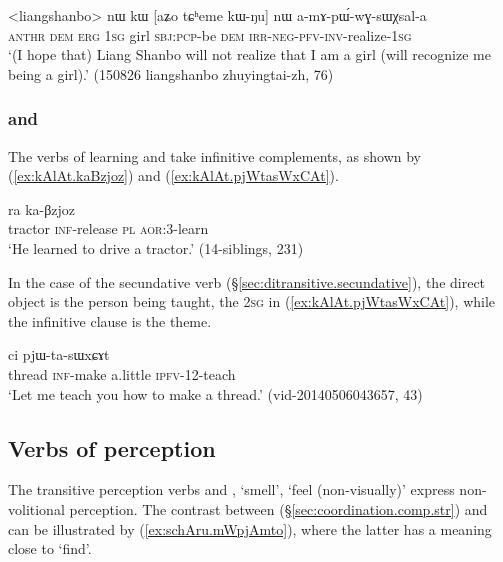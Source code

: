 \begin{exe}
\ex \label{ex:kWNu.amApWwGsWXsala}
 \gll <liangshanbo> nɯ kɯ [aʑo tɕʰeme kɯ-ŋu] nɯ a-mɤ-pɯ́-wɣ-sɯχsal-a \\
  \textsc{anthr} \textsc{dem} \textsc{erg} \textsc{1sg} girl \textsc{sbj}:\textsc{pcp}-be \textsc{dem} \textsc{irr}-\textsc{neg}-\textsc{pfv}-\textsc{inv}-realize-\textsc{1sg} \\
 \glt `(I hope that) Liang Shanbo will not realize that I am a girl (will recognize me being a girl).' (150826 liangshanbo zhuyingtai-zh, 76)
 \end{exe}

 
 \subsubsection{ and } \label{sec:Bzjoz.sWxCAt.complement}
 The verbs of learning  and  take infinitive complements, as shown by (\ref{ex:kAlAt.kaBzjoz}) and (\ref{ex:kAlAt.pjWtasWxCAt}).
 
\begin{exe}
\ex \label{ex:kAlAt.kaBzjoz}
  ra ka-βzjoz \\
 tractor \textsc{inf}-release \textsc{pl} \textsc{aor}:3\flobv{}-learn \\
 \glt  `He learned to drive a tractor.' (14-siblings, 231)
 \end{exe}

In the case of the secundative verb  (§\ref{sec:ditransitive.secundative}), the direct object is the person being taught, the \textsc{2sg} in (\ref{ex:kAlAt.pjWtasWxCAt}), while the infinitive clause is the theme.

\begin{exe}
\ex \label{ex:kAlAt.pjWtasWxCAt}
  ci pjɯ-ta-sɯxɕɤt \\
 thread \textsc{inf}-make a.little \textsc{ipfv}-1\fl{}2-teach \\
 \glt `Let me teach you how to make a thread.' (vid-20140506043657, 43)
  \end{exe}
  
 \subsection{Verbs of perception}   \label{sec:mto.mtshAm.complement}
The transitive perception verbs  and , `smell', `feel (non-visually)' express non-volitional perception. The contrast between  (§\ref{sec:coordination.comp.str}) and  can be illustrated by (\ref{ex:schAru.mWpjAmto}), where the latter has a meaning close to `find'.

